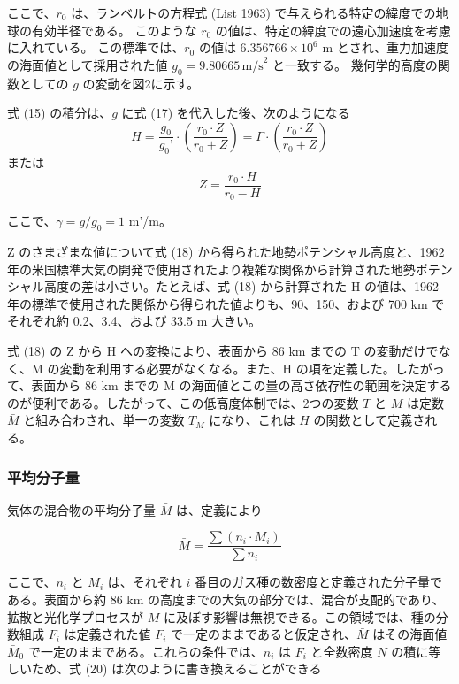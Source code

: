 \documentclass{article}
\begin{document}
ここで、$r_0$ は、ランベルトの方程式 (List 1963) で与えられる特定の緯度での地球の有効半径である。
このような $r_0$ の値は、特定の緯度での遠心加速度を考慮に入れている。
この標準では、$r_0$ の値は $6.356766 \times 10^6$ m とされ、重力加速度の海面値として採用された値 $g_0 = 9.80665 \, \text{m/s}^2$ と一致する。
幾何学的高度の関数としての $g$ の変動を図2に示す。

式 (15) の積分は、$g$ に式 (17) を代入した後、次のようになる
\begin{equation}
 H = \frac{g_0}{g_0\text{'}} \cdot (\frac{r_0 \cdot Z}{r_0+Z}) = \Gamma \cdot(\frac{r_0\cdot Z}{r_0+Z}) \tag{18}
\end{equation}
または
\begin{equation}
 Z = \frac{r_0 \cdot H}{r_0 - H} \tag{19}
\end{equation}

ここで、$\gamma = g/g_0 = 1$ m'/m。

Z のさまざまな値について式 (18) から得られた地勢ポテンシャル高度と、1962 年の米国標準大気の開発で使用されたより複雑な関係から計算された地勢ポテンシャル高度の差は小さい。たとえば、式 (18) から計算された H の値は、1962 年の標準で使用された関係から得られた値よりも、90、150、および 700 km でそれぞれ約 0.2、3.4、および 33.5 m 大きい。

式 (18) の Z から H への変換により、表面から 86 km までの T の変動だけでなく、M の変動を利用する必要がなくなる。また、H の項を定義した。したがって、表面から 86 km までの M の海面値とこの量の高さ依存性の範囲を決定するのが便利である。したがって、この低高度体制では、2つの変数 $T$ と $M$ は定数 $\bar{M}$ と組み合わされ、単一の変数 $T_M$ になり、これは $H$ の関数として定義される。

\subsubsection{平均分子量}
気体の混合物の平均分子量 $\bar{M}$ は、定義により

\begin{equation}
 \bar{M} = \frac{\sum (n_i \cdot M_i)}{\sum n_i} \tag{20}
\end{equation}

ここで、$n_i$ と $M_i$ は、それぞれ $i$ 番目のガス種の数密度と定義された分子量である。表面から約 86 km の高度までの大気の部分では、混合が支配的であり、拡散と光化学プロセスが $\bar{M}$ に及ぼす影響は無視できる。この領域では、種の分数組成 $F_i$ は定義された値 $F_i$ で一定のままであると仮定され、$\bar{M}$ はその海面値 $\bar{M}_0$ で一定のままである。これらの条件では、$n_i$ は $F_i$ と全数密度 $N$ の積に等しいため、式 (20) は次のように書き換えることができる
\end{document}
